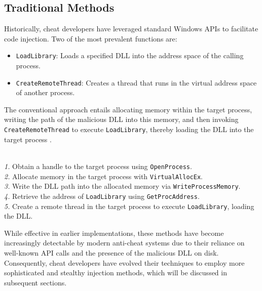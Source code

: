 \subsection*{Traditional Methods}

Historically, cheat developers have leveraged standard Windows APIs to facilitate code injection. Two of the most prevalent functions are:

\begin{itemize}
    \item \texttt{LoadLibrary}: Loads a specified DLL into the address space of the calling process.
    \item \texttt{CreateRemoteThread}: Creates a thread that runs in the virtual address space of another process.
\end{itemize}

The conventional approach entails allocating memory within the target process, writing the path of the malicious DLL into this memory, and then invoking \texttt{CreateRemoteThread} to execute \texttt{LoadLibrary}, thereby loading the DLL into the target process \parencite{elastic2023injection}.

\begin{tcolorbox}[colback=gray!10, colframe=gray!50, boxrule=0pt, sharp corners, width=\linewidth, left=1mm, right=1mm, top=0.5mm, bottom=0.5mm]
 \\
\textit{1.} Obtain a handle to the target process using \texttt{OpenProcess}. \\
\textit{2.} Allocate memory in the target process with \texttt{VirtualAllocEx}. \\
\textit{3.} Write the DLL path into the allocated memory via \texttt{WriteProcessMemory}. \\
\textit{4.} Retrieve the address of \texttt{LoadLibrary} using \texttt{GetProcAddress}. \\
\textit{5.} Create a remote thread in the target process to execute \texttt{LoadLibrary}, loading the DLL.
\end{tcolorbox}

While effective in earlier implementations, these methods have become increasingly detectable by modern anti-cheat systems due to their reliance on well-known API calls and the presence of the malicious DLL on disk. Consequently, cheat developers have evolved their techniques to employ more sophisticated and stealthy injection methods, which will be discussed in subsequent sections.

